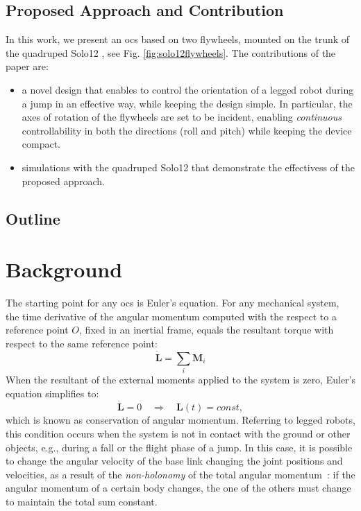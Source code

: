 \documentclass[letterpaper, 10 pt, conference]{ieeeconf}  %
\begin{document}
\subsection{Proposed Approach and Contribution}
In this work, we present an \gls{ocs} based on two flywheels,  mounted on the trunk of the quadruped Solo12 \cite{grimminger2020open}, see Fig. \ref{fig:solo12flywheels}. 
The contributions of the paper are:
\begin{itemize}
	\item a novel design that enables to control the orientation of a legged robot during a jump in an effective way, while keeping the design simple. 
	In particular,  the axes of rotation of the flywheels are set to be incident, enabling \textit{continuous} controllability in both the directions (roll and pitch) while keeping the  device compact.
	\item simulations  with the quadruped Solo12 that demonstrate the effectivess of the proposed approach.
\end{itemize}



\subsection{Outline}
% 

\section{Background}
The starting point for any \gls{ocs} is Euler's equation. For any mechanical system, the time derivative of the angular momentum computed with the respect to a reference point $O$, fixed in an inertial frame,  equals the resultant torque with respect to the same reference point:
\begin{equation}
\dot{\bm{L}} = \sum_i \bm{M}_i
\end{equation}
When the resultant of the external moments applied to the system is zero, Euler’s equation simplifies to:
\begin{equation}
\dot{\bm{L}} = 0 \quad \Rightarrow \quad \bm{L}(t) = const,
\label{eq:cons_ang_mom}
\end{equation}
which is known as conservation of angular momentum.
Referring to legged robots, this condition occurs when the system is not in contact with the ground or other objects, e.g., during a fall or the flight phase of a jump.
In this case, it is possible to change the angular velocity of the base link changing the joint positions and velocities, as a result of the \textit{non-holonomy} of the total angular momentum~\cite{Wieber16}: if the angular momentum of a certain body changes, the one of the others must change to maintain the total sum constant.
\end{document}
